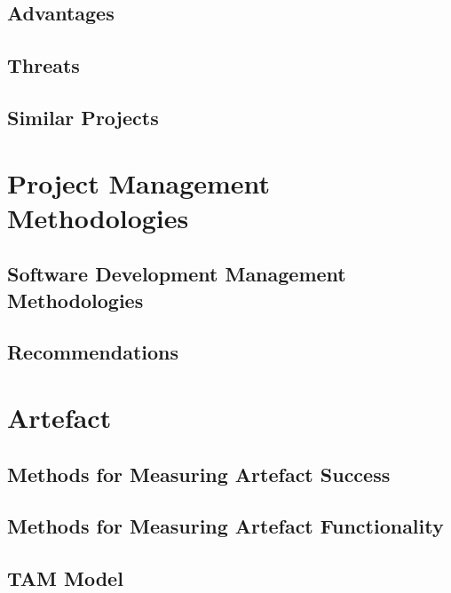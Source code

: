 \subsection{Advantages}
\subsection{Threats}
\subsection{Similar Projects}

\section{Project Management Methodologies}
\subsection{Software Development Management Methodologies}
\subsection{Recommendations}

\section{Artefact}
\subsection{Methods for Measuring Artefact Success}
\subsection{Methods for Measuring Artefact Functionality}
\subsection{TAM Model}